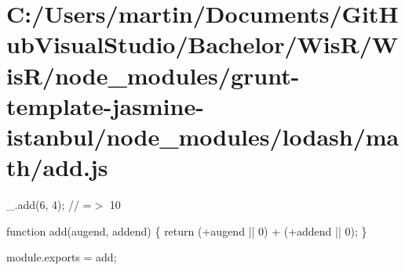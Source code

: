 \hypertarget{_c_1_2_users_2martin_2_documents_2_git_hub_visual_studio_2_bachelor_2_wis_r_2_wis_r_2node_module2a04e5586b4262d3ee012b77f86b305a}{}\section{C\+:/\+Users/martin/\+Documents/\+Git\+Hub\+Visual\+Studio/\+Bachelor/\+Wis\+R/\+Wis\+R/node\+\_\+modules/grunt-\/template-\/jasmine-\/istanbul/node\+\_\+modules/lodash/math/add.\+js}
\+\_\+.\+add(6, 4); // =$>$ 10


\begin{DoxyCodeInclude}

\textcolor{keyword}{function} add(augend, addend) \{
  \textcolor{keywordflow}{return} (+augend || 0) + (+addend || 0);
\}

module.exports = add;
\end{DoxyCodeInclude}
 